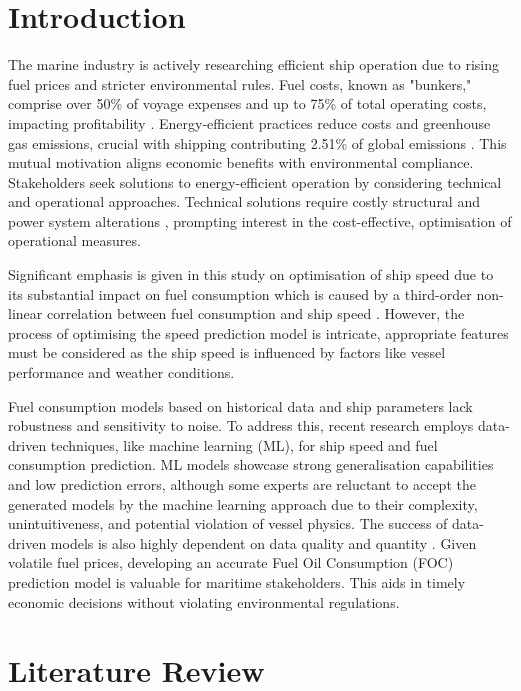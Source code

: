 \documentclass[]{interact}
\theoremstyle{plain}%
\theoremstyle{definition}
\theoremstyle{remark}
\begin{document}
\section{Introduction}

The marine industry is actively researching efficient ship operation due to rising fuel prices and stricter environmental rules. Fuel costs, known as "bunkers," comprise over 50\% of voyage expenses and up to 75\% of total operating costs, impacting profitability \citep{Bialystocki.2016}. Energy-efficient practices reduce costs and greenhouse gas emissions, crucial with shipping contributing 2.51\% of global emissions \citep{IMO.2020}. This mutual motivation aligns economic benefits with environmental compliance. Stakeholders seek solutions to energy-efficient operation by considering technical and operational approaches. Technical solutions require costly structural and power system alterations \citep{Yan.2021,Li.2022}, prompting interest in the cost-effective, optimisation of operational measures.

Significant emphasis is given in this study on optimisation of ship speed due to its substantial impact on fuel consumption which is caused by a third-order non-linear correlation between fuel consumption and ship speed \citep{Wang.2012,Du.2019}. However, the process of optimising the speed prediction model is intricate, appropriate features must be considered as the ship speed is influenced by factors like vessel performance and weather conditions.

Fuel consumption models based on historical data and ship parameters lack robustness and sensitivity to noise. To address this, recent research employs data-driven techniques, like machine learning (ML), for ship speed and fuel consumption prediction. ML models showcase strong generalisation capabilities and low prediction errors, although some experts are reluctant to accept the generated models by the machine learning approach due to their complexity, unintuitiveness, and potential violation of vessel physics. The success of data-driven models is also highly dependent on data quality and quantity \citep{Yan.2021,Gkerekos.2019}. Given volatile fuel prices, developing an accurate Fuel Oil Consumption (FOC) prediction model is valuable for maritime stakeholders. This aids in timely economic decisions without violating environmental regulations.


\section{Literature Review}\label{sec:literature_review}
\end{document}
